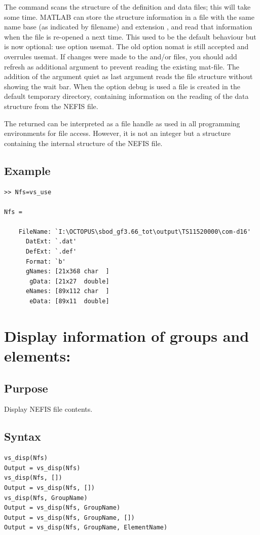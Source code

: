 The \vsuse command scans the structure of the definition and data files; this will take some time.
MATLAB can store the structure information in a file with the same name base (as indicated by filename) and extension , and read that information when the file is re-opened a next time.
This used to be the default behaviour but is now optional: use option usemat.
The old option nomat is still accepted and overrules usemat.
If changes were made to the  and/or  files, you should add refresh as additional argument to prevent reading the existing mat-file.
The addition of the argument quiet as last argument reads the file structure without showing the wait bar.
When the option debug is used a file  is created in the default temporary directory, containing information on the reading of the data structure from the NEFIS file.

The returned  can be interpreted as a file handle as used in all programming environments for file access.
However, it is not an integer but a structure containing the internal structure of the NEFIS file.

\subsection*{Example}
\begin{Verbatim}
>> Nfs=vs_use

Nfs =

    FileName: `I:\OCTOPUS\sbod_gf3.66_tot\output\TS11520000\com-d16'
      DatExt: `.dat'
      DefExt: `.def'
      Format: `b'
      gNames: [21x368 char  ]
       gData: [21x27  double]
      eNames: [89x112 char  ]
       eData: [89x11  double]
\end{Verbatim}

\section{Display information of groups and elements: \vsdisp}

\subsection*{Purpose}
Display NEFIS file contents.

\subsection*{Syntax}
\begin{Verbatim}
vs_disp(Nfs)
Output = vs_disp(Nfs)
vs_disp(Nfs, [])
Output = vs_disp(Nfs, [])
vs_disp(Nfs, GroupName)
Output = vs_disp(Nfs, GroupName)
Output = vs_disp(Nfs, GroupName, [])
Output = vs_disp(Nfs, GroupName, ElementName)
\end{Verbatim}


